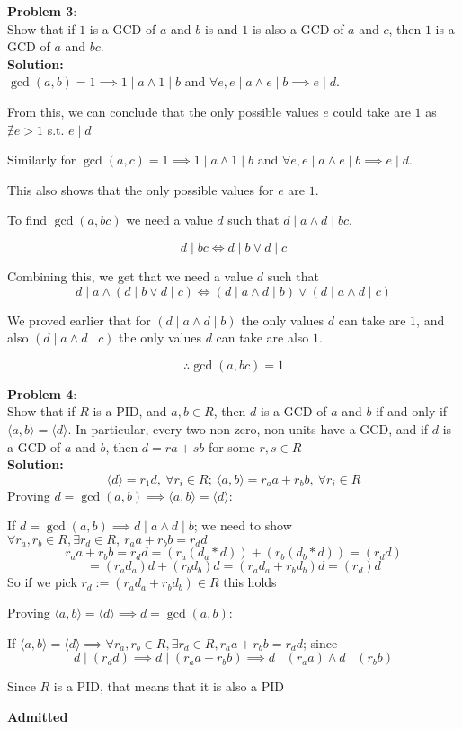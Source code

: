 \documentclass[11pt]{article}
\newcommand{\prob}[3]{\begin{flushleft}
        \textbf{Problem #1}: \\
        #2 
		\textbf{Solution:} 
		#3

\end{flushleft}}
\newcommand{\admit}{
  \begin{flushright}
    \textbf{Admitted}
  \end{flushright}
}
\begin{document}
\prob{3}{
  Show that if $1$ is a GCD of $a$ and $b$ is and $1$ is also a GCD of $a$ and $c$, then $1$ is a GCD of $a$ and $bc$. \\
}{ \\
  $\gcd(a,b) = 1 \implies 1 \mid a \land 1 \mid b$ and $\forall e, e \mid a \land e \mid b \implies e \mid d$.

  From this, we can conclude that the only possible values $e$ could take are $1$ as $\nexists e > 1$ s.t. $e \mid d$

  Similarly for $\gcd(a,c) = 1 \implies 1 \mid a \land 1 \mid b$ and $\forall e, e \mid a \land e \mid b \implies e \mid d$.

  This also shows that the only possible values for $e$ are $1$.

  To find $\gcd(a, bc)$ we need a value $d$ such that $d \mid a \land d \mid bc$.

  $$d \mid bc \iff d \mid b \lor d \mid c$$

  Combining this, we get that we need a value $d$ such that
  $$d \mid a \land (d \mid b \lor d \mid c) \iff (d \mid a \land d \mid b) \lor (d \mid a \land d \mid c)$$

  We proved earlier that for $(d \mid a \land d \mid b)$ the only values $d$ can take are $1$, and also $(d \mid a \land d \mid c)$ the only values $d$ can take are also $1$.

  $$\therefore \gcd(a,bc) = 1$$
}

\prob{4}{
  Show that if $R$ is a PID, and $a, b \in R$, then $d$ is a GCD of $a$ and $b$ if and only if $\langle a, b \rangle = \langle d \rangle$.
  In particular, every two non-zero, non-units have a GCD, and if $d$ is a GCD of $a$ and $b$, then $d = ra + sb$ for some $r, s \in R$ \\
}{ \\
  $$\langle d \rangle = r_1 d,\ \forall r_i \in R;\
    \langle a, b \rangle = r_a a + r_b b,\ \forall r_i \in R$$
  Proving $d = \gcd(a,b) \implies \langle a, b \rangle = \langle d \rangle$:

  If $d = \gcd(a,b) \implies d \mid a \land d \mid b$;
  we need to show $\forall r_a, r_b \in R,\exists r_d \in R,\ r_a a + r_b b = r_d d$
  $$r_a a + r_b b = r_d d = (r_a (d_a * d)) + (r_b (d_b * d)) = (r_d d)$$
  $$= (r_a d_a) d + (r_b d_b) d = (r_a d_a + r_b d_b) d = (r_d) d$$
  So if we pick $r_d := (r_a d_a + r_b d_b) \in R$ this holds

  Proving $\langle a, b \rangle = \langle d \rangle \implies d = \gcd(a,b) $:

  If $\langle a, b \rangle = \langle d \rangle \implies \forall r_a, r_b \in R, \exists r_d \in R, r_a a + r_b b = r_d d$; since
  $$d \mid (r_d d) \implies d \mid (r_a a + r_b b) \implies d \mid (r_a a) \land d \mid (r_b b)$$

  Since $R$ is a PID, that means that it is also a PID
  \admit
}
\end{document}

